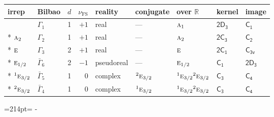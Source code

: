 \documentclass[10pt,a4paper]{article}
\makeatletter
\def\grouprule#1#2{\noalign{\marks\LTgroupmarks{\the\belowrulesep}\nobreak\vskip#1%
  \vskip\aboverulesep}\multispan\LT@cols\unskip{\leaders\hrule\@height#2\hfill\kern\z@}\cr
  \noalign{\penalty\LTrulebreak\vskip\belowrulesep\global\@lastruleclass\z@}}
\newcommand{\needspace}[1]{\par\penalty-100\begingroup\dimen0=#1\relax\dimen2=\pagegoal
  \advance\dimen2-\pagetotal\ifdim\dimen0>\dimen2\relax\ifdim\dimen2>0pt\vfil\break\fi\fi
  \endgroup}
\numberwithin{equation}{section}
\newcommand{\grp}[1]{\mathsf{#1}}
\newcommand{\irr}[1]{\text{\normalfont\scshape #1}}
\newcommand{\conjpair}[1]{{}^{#1}}
\newcommand{\detbox}[1]{{\setlength{\fboxsep}{1pt}\fbox{#1}}}
\newcommand{\fsind}{\nu_{\mathrm{FS}}}
\makeatother
\begin{document}
{\small\renewcommand{\arraystretch}{1.25}\setlength{\tabcolsep}{4pt}\begin{longtable}{@{}llrrlllll@{}}\toprule
irrep & Bilbao & $d$ & $\fsind$ & reality & conjugate & over $\mathbb{R}$ & kernel & image\\\midrule\endhead
\bottomrule\endfoot\endlastfoot
\detbox{$\irr{a}_{1}$} & $\Gamma_{1}$ & 1 & $+1$ & real & --- & $\irr{a}_{1}$ & \href{2D3.pdf}{$\grp{2D_{3}}$} & \href{../../../rotation/data/pdf/C1.pdf}{$\grp{C_{1}}$}\\*
$\irr{a}_{2}$ & $\Gamma_{2}$ & 1 & $+1$ & real & --- & $\irr{a}_{2}$ & \href{2C3.pdf}{$\grp{2C_{3}}$} & \href{../../../rotation/data/pdf/C2.pdf}{$\grp{C_{2}}$}\\*
$\irr{e}$ & $\Gamma_{3}$ & 2 & $+1$ & real & --- & $\irr{e}$ & \href{2C1.pdf}{$\grp{2C_{1}}$} & \href{../../../rotation/data/pdf/C3v.pdf}{$\grp{C_{3v}}$}\\*
\grouprule{0pt}{\lightrulewidth}
$\irr{e}_{1/2}$ & $\bar{\Gamma}_{6}$ & 2 & $-1$ & pseudoreal & --- & $\irr{e}_{1/2}$ & \href{C1.pdf}{$\grp{C_{1}}$} & \href{2D3.pdf}{$\grp{2D_{3}}$}\\*
$\conjpair{1}\irr{e}_{3/2}$ & $\bar{\Gamma}_{5}$ & 1 & $0$ & complex & $\conjpair{2}\irr{e}_{3/2}$ & $\conjpair{1}\irr{e}_{3/2}\conjpair{2}\irr{e}_{3/2}$ & \href{C3.pdf}{$\grp{C_{3}}$} & \href{../../../rotation/data/pdf/C4.pdf}{$\grp{C_{4}}$}\\*
$\conjpair{2}\irr{e}_{3/2}$ & $\bar{\Gamma}_{4}$ & 1 & $0$ & complex & $\conjpair{1}\irr{e}_{3/2}$ & $\conjpair{1}\irr{e}_{3/2}\conjpair{2}\irr{e}_{3/2}$ & \href{C3.pdf}{$\grp{C_{3}}$} & \href{../../../rotation/data/pdf/C4.pdf}{$\grp{C_{4}}$}\\
\bottomrule\end{longtable}}
\needspace{214pt}
\end{document}
